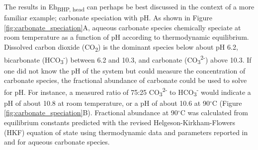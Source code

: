The results in Eh\textsubscript{BHP, head} can perhaps be best discussed in the context of a more familiar example; carbonate speciation with pH. As shown in Figure \ref{fig:carbonate_speciation}A, aqueous carbonate species chemically speciate at room temperature as a function of pH according to thermodynamic equilibrium. Dissolved carbon dioxide (CO\textsubscript{2}) is the dominant species below about pH 6.2, bicarbonate (HCO\textsubscript{3}\textsuperscript{-}) between 6.2 and 10.3, and carbonate (CO\textsubscript{3}\textsuperscript{2-}) above 10.3. If one did not know the pH of the system but could measure the concentration of carbonate species, the fractional abundance of carbonate could be used to solve for pH. For instance, a measured ratio of 75:25 CO\textsubscript{3}\textsuperscript{2-} to HCO\textsubscript{3}\textsuperscript{-} would indicate a pH of about 10.8 at room temperature, or a pH of about 10.6 at 90$^{\circ}$C (Figure \ref{fig:carbonate_speciation}B). Fractional abundance at 90$^{\circ}$C was calculated from equilibrium constants predicted with the revised Helgeson-Kirkham-Flowers (HKF) equation of state \citep{shock1992calculation} using thermodynamic data and parameters reported in \cite{shock1988calculation} and \cite{plyasunov2001correlation} for aqueous carbonate species.

